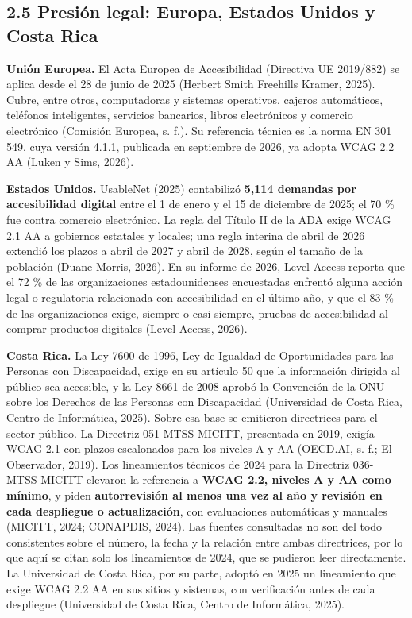 \documentclass[10pt,letterpaper,onecolumn]{IEEEtran}
\begin{document}
\subsection{2.5 Presión legal: Europa, Estados Unidos y Costa Rica}\label{presiuxf3n-legal-europa-estados-unidos-y-costa-rica}

\textbf{Unión Europea.} El Acta Europea de Accesibilidad (Directiva UE 2019/882) se aplica desde el 28 de junio de 2025 (Herbert Smith Freehills Kramer, 2025). Cubre, entre otros, computadoras y sistemas operativos, cajeros automáticos, teléfonos inteligentes, servicios bancarios, libros electrónicos y comercio electrónico (Comisión Europea, s. f.). Su referencia técnica es la norma EN 301 549, cuya versión 4.1.1, publicada en septiembre de 2026, ya adopta WCAG 2.2 AA (Luken y Sims, 2026).

\textbf{Estados Unidos.} UsableNet (2025) contabilizó \textbf{5,114 demandas por accesibilidad digital} entre el 1 de enero y el 15 de diciembre de 2025; el 70 \% fue contra comercio electrónico. La regla del Título II de la ADA exige WCAG 2.1 AA a gobiernos estatales y locales; una regla interina de abril de 2026 extendió los plazos a abril de 2027 y abril de 2028, según el tamaño de la población (Duane Morris, 2026). En su informe de 2026, Level Access reporta que el 72 \% de las organizaciones estadounidenses encuestadas enfrentó alguna acción legal o regulatoria relacionada con accesibilidad en el último año, y que el 83 \% de las organizaciones exige, siempre o casi siempre, pruebas de accesibilidad al comprar productos digitales (Level Access, 2026).

\textbf{Costa Rica.} La Ley 7600 de 1996, Ley de Igualdad de Oportunidades para las Personas con Discapacidad, exige en su artículo 50 que la información dirigida al público sea accesible, y la Ley 8661 de 2008 aprobó la Convención de la ONU sobre los Derechos de las Personas con Discapacidad (Universidad de Costa Rica, Centro de Informática, 2025). Sobre esa base se emitieron directrices para el sector público. La Directriz 051-MTSS-MICITT, presentada en 2019, exigía WCAG 2.1 con plazos escalonados para los niveles A y AA (OECD.AI, s. f.; El Observador, 2019). Los lineamientos técnicos de 2024 para la Directriz 036-MTSS-MICITT elevaron la referencia a \textbf{WCAG 2.2, niveles A y AA como mínimo}, y piden \textbf{autorrevisión al menos una vez al año y revisión en cada despliegue o actualización}, con evaluaciones automáticas y manuales (MICITT, 2024; CONAPDIS, 2024). Las fuentes consultadas no son del todo consistentes sobre el número, la fecha y la relación entre ambas directrices, por lo que aquí se citan solo los lineamientos de 2024, que se pudieron leer directamente. La Universidad de Costa Rica, por su parte, adoptó en 2025 un lineamiento que exige WCAG 2.2 AA en sus sitios y sistemas, con verificación antes de cada despliegue (Universidad de Costa Rica, Centro de Informática, 2025).
\end{document}
